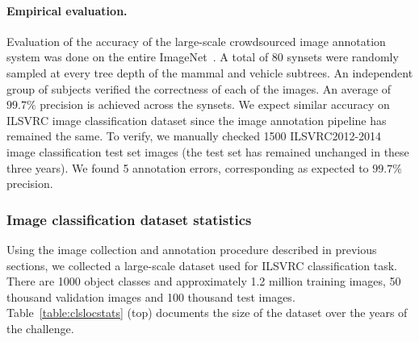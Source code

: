 \paragraph{Empirical evaluation.}  Evaluation of the accuracy of the large-scale crowdsourced image annotation system was done on the entire ImageNet~\citep{ImageNet}. 
A total of 80 synsets were randomly sampled at every tree depth of
the mammal and vehicle subtrees. An independent group of subjects verified the correctness of each of the images. An average of $99.7\%$ precision is achieved across the synsets. We expect similar accuracy on ILSVRC image classification dataset since the image annotation pipeline has remained the same. To verify, we manually checked 1500 ILSVRC2012-2014 image classification test set images (the test set has remained unchanged in these three years). We found 5 annotation errors, corresponding as expected to $99.7\%$ precision.


\subsubsection{Image classification dataset statistics}
\label{sec:ClsStats}


Using the image collection and annotation procedure described in previous sections, we collected a large-scale dataset
used for ILSVRC classification task. There are 1000 object classes and approximately 1.2 million training images, 50 thousand validation images and 100 thousand test images. Table~\ref{table:clslocstats} (top) documents the size of the dataset over the years of the challenge. 

